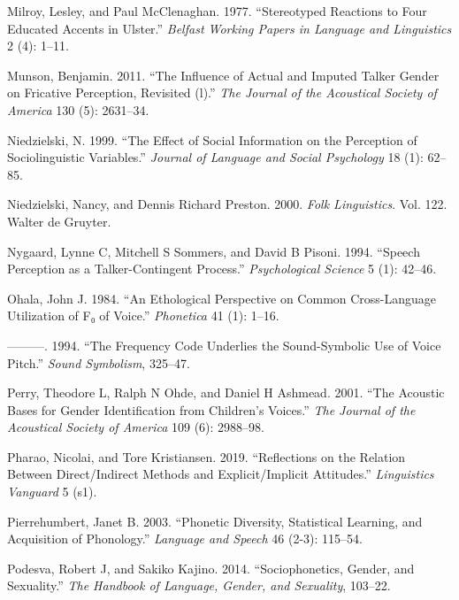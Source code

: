 \documentclass[
  letterpaper,
  DIV=11,
  numbers=noendperiod]{scrartcl}
\newlength{\cslhangindent}
\newenvironment{CSLReferences}[2] %
 {\begin{list}{}{%
  \setlength{\itemindent}{0pt}
  \setlength{\leftmargin}{0pt}
  \setlength{\parsep}{0pt}
  \ifodd #1
   \setlength{\leftmargin}{\cslhangindent}
   \setlength{\itemindent}{-1\cslhangindent}
  \fi
  \setlength{\itemsep}{#2\baselineskip}}}
 {\end{list}}
\begin{document}
\begin{CSLReferences}{1}{0}
Milroy, Lesley, and Paul McClenaghan. 1977. {``Stereotyped Reactions to
Four Educated Accents in Ulster.''} \emph{Belfast Working Papers in
Language and Linguistics} 2 (4): 1--11.

Munson, Benjamin. 2011. {``The Influence of Actual and Imputed Talker
Gender on Fricative Perception, Revisited (l).''} \emph{The Journal of
the Acoustical Society of America} 130 (5): 2631--34.

Niedzielski, N. 1999. {``The Effect of Social Information on the
Perception of Sociolinguistic Variables.''} \emph{Journal of Language
and Social Psychology} 18 (1): 62--85.

Niedzielski, Nancy, and Dennis Richard Preston. 2000. \emph{Folk
Linguistics}. Vol. 122. Walter de Gruyter.

Nygaard, Lynne C, Mitchell S Sommers, and David B Pisoni. 1994.
{``Speech Perception as a Talker-Contingent Process.''}
\emph{Psychological Science} 5 (1): 42--46.

Ohala, John J. 1984. {``An Ethological Perspective on Common
Cross-Language Utilization of F₀ of Voice.''} \emph{Phonetica} 41 (1):
1--16.

---------. 1994. {``The Frequency Code Underlies the Sound-Symbolic Use
of Voice Pitch.''} \emph{Sound Symbolism}, 325--47.

Perry, Theodore L, Ralph N Ohde, and Daniel H Ashmead. 2001. {``The
Acoustic Bases for Gender Identification from Children's Voices.''}
\emph{The Journal of the Acoustical Society of America} 109 (6):
2988--98.

Pharao, Nicolai, and Tore Kristiansen. 2019. {``Reflections on the
Relation Between Direct/Indirect Methods and Explicit/Implicit
Attitudes.''} \emph{Linguistics Vanguard} 5 (s1).

Pierrehumbert, Janet B. 2003. {``Phonetic Diversity, Statistical
Learning, and Acquisition of Phonology.''} \emph{Language and Speech} 46
(2-3): 115--54.

Podesva, Robert J, and Sakiko Kajino. 2014. {``Sociophonetics, Gender,
and Sexuality.''} \emph{The Handbook of Language, Gender, and
Sexuality}, 103--22.


\end{CSLReferences}
\end{document}
